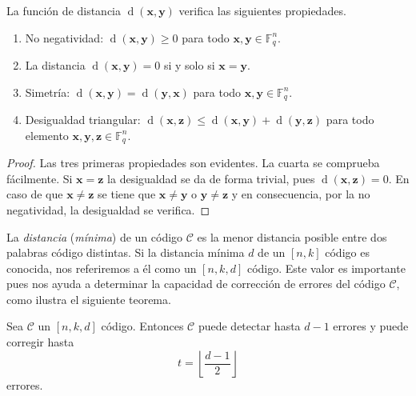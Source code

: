 \begin{theorem}
  La función de distancia \(\operatorname{d}(\mathbf{x}, \mathbf{y})\) verifica las siguientes propiedades.
  \begin{enumerate}
    \item No negatividad: \(\operatorname{d}(\mathbf{x}, \mathbf{y}) \geq 0\) para todo \(\mathbf{x}, \mathbf{y}\in \mathbb F_q^n\).
    \item La distancia \(\operatorname{d}(\mathbf{x}, \mathbf{y}) = 0\) si y solo si \(\mathbf{x} = \mathbf{y}\).
    \item Simetría: \(\operatorname{d}(\mathbf{x}, \mathbf{y}) = \operatorname{d}(\mathbf{y}, \mathbf{x})\) para todo \(\mathbf{x}, \mathbf{y}\in \mathbb F_q^n\).
    \item Desigualdad triangular: \(\operatorname{d}(\mathbf{x}, \mathbf{z}) \leq \operatorname{d}(\mathbf{x}, \mathbf{y}) + \operatorname{d}(\mathbf{y}, \mathbf{z})\) para todo elemento \(\mathbf{x}, \mathbf{y}, \mathbf{z}\in \mathbb F_q^n\).
  \end{enumerate}
\end{theorem}

\begin{proof}
  Las tres primeras propiedades son evidentes.
  La cuarta se comprueba fácilmente.
  Si \(\mathbf{x} = \mathbf{z}\) la desigualdad se da de forma trivial, pues \(\operatorname{d}(\mathbf{x}, \mathbf{z}) = 0\).
  En caso de que \(\mathbf{x} \neq \mathbf{z}\) se tiene que \(\mathbf{x} \neq \mathbf{y}\) o \(\mathbf{y} \neq \mathbf{z}\) y en consecuencia, por la no negatividad, la desigualdad se verifica.
\end{proof}

La \textit{distancia} (\textit{mínima}) de un código \(\mathcal C\) es la menor distancia posible entre dos palabras código distintas. 
Si la distancia mínima \(d\) de un \([n,k]\) código es conocida, nos referiremos a él como un \([n,k,d]\) código.
Este valor es importante pues nos ayuda a determinar la capacidad de corrección de errores del código \(\mathcal C\), como ilustra el siguiente teorema.

\begin{theorem}
  Sea \(\mathcal C\) un \([n, k, d]\) código. Entonces \(\mathcal C\) puede detectar hasta \(d - 1\) errores y puede corregir hasta \[
    t = \left\lfloor \frac{d - 1}{2} \right\rfloor
  \]
  errores.
\end{theorem}

